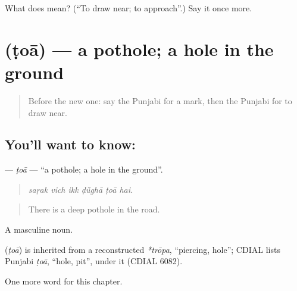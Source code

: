 \begin{tcolorbox}[breakable,colback=teal!4,colframe=teal!35!black,title={Before you move on}]
What does  mean? (\textquotedblleft{}To draw near; to approach\textquotedblright{}.) Say it once more.
\end{tcolorbox}
\section[\texorpdfstring{\pa{ਟੋਆ} (ṭoā)}{ਟੋਆ (ṭoā)}]{ (ṭoā) — a pothole; a hole in the ground}

\label{lesson:PA-C269-toa}



\begin{quote}
Before the new one: say the Punjabi for a mark, then the Punjabi for to draw near.
\end{quote}

\subsection*{You'll want to know: }
\textbf{} — \emph{ṭoā} — \textquotedblleft{}a pothole; a hole in the ground\textquotedblright{}.

\begin{quote}
     
\end{quote}

\begin{quote}
\emph{saṛak vich ikk ḍū̃ghā ṭoā hai.}
\end{quote}

\begin{quote}
There is a deep pothole in the road.
\end{quote}

A masculine noun.

\begin{cousinweb}
\textbf{} (\emph{ṭoā}) is inherited from a reconstructed \emph{*trōpa}, \textquotedblleft{}piercing, hole\textquotedblright{}; CDIAL lists Punjabi \emph{ṭoā}, \textquotedblleft{}hole, pit\textquotedblright{}, under it (CDIAL 6082).
\end{cousinweb}

\begin{grammarlens}[title={What you've built}]
One more word for this chapter.
\end{grammarlens}

